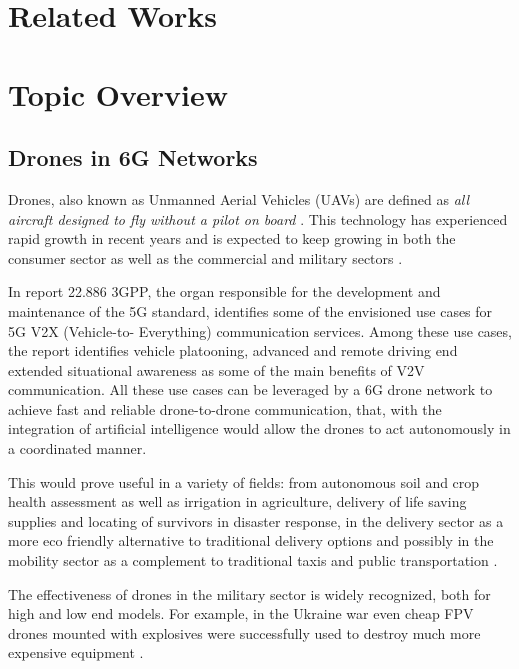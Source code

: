 \documentclass[futureinternet,article,submit,pdftex,moreauthors]{Definitions/mdpi}
\begin{document}
\section{Related Works}

\lipsum[1-5]

\section{Topic Overview}

\subsection{Drones in 6G Networks}

Drones, also known as Unmanned Aerial Vehicles (UAVs) are defined as \textit{all aircraft designed to fly
without a pilot on board} \cite{DronesEC}. This technology has experienced rapid growth in recent years and is expected to 
keep growing in both the consumer sector as well as the commercial and military sectors \cite{DronesStatisticsLaricchia}.

In report 22.886 \cite{5GV2XSultan} 3GPP, the organ responsible for the development and maintenance of the 5G standard, identifies some of the envisioned use cases for 5G V2X (Vehicle-to-
Everything) communication services. Among these use cases, the report identifies vehicle platooning, advanced and remote driving end extended situational awareness as some of the main benefits
of V2V communication. All these use cases can be leveraged by a 6G drone network to achieve fast and reliable drone-to-drone communication, that, with the integration of artificial intelligence 
would allow the drones to act autonomously in a coordinated manner. 

This would prove useful in a variety of fields: from autonomous soil and crop health assessment as well as irrigation in agriculture, 
delivery of life saving supplies and locating of survivors in disaster response, in the delivery sector as a more eco friendly alternative to traditional 
delivery options and possibly in the mobility sector as a complement to traditional taxis and public transportation \cite{DroneCommHassija}. 

The effectiveness of drones in the military sector is widely recognized, both for high and low end models. For example, in the Ukraine war even cheap FPV drones 
mounted with explosives were successfully used to destroy much more expensive equipment \cite{DroneCombatUkraine}. 
\end{document}
